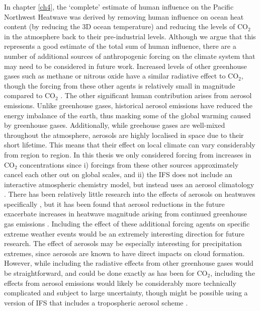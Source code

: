     In chapter \ref{ch4}, the `complete' estimate of human influence on the Pacific Northwest Heatwave was derived by removing human influence on ocean heat content (by reducing the 3D ocean temperature) and reducing the levels of CO$_2$ in the atmosphere back to their pre-industrial levels. Although we argue that this represents a good estimate of the total sum of human influence, there are a number of additional sources of anthropogenic forcing on the climate system that may need to be considered in future work. Increased levels of other greenhouse gases such as methane or nitrous oxide have a similar radiative effect to CO$_2$, though the forcing from these other agents is relatively small in magnitude compared to CO$_2$ \citep{masson-delmotte_earths_2021}. The other significant human contribution arises from aerosol emissions. Unlike greenhouse gases, historical aerosol emissions have reduced the energy imbalance of the earth, thus masking some of the global warming caused by greenhouse gases. Additionally, while greehouse gases are well-mixed throughout the atmosphere, aerosols are highly localised in space due to their short lifetime. This means that their effect on local climate can vary considerably from region to region. In this thesis we only considered forcing from increases in CO$_2$ concentrations since i) forcings from these other sources approximately cancel each other out on global scales, and ii) the IFS does not include an interactive atmospheric chemistry model, but instead uses an aerosol climatology \citep{bozzo_aerosol_2020}. There has been relatively little research into the effects of aerosols on heatwaves specifically \citep{horton_review_2016}, but it has been found that aerosol reductions in the future exacerbate increases in heatwave magnitude arising from continued greenhouse gas emissions \citep{zhao_strong_2019}. Including the effect of these additional forcing agents on specific extreme weather events would be an extremely interesting direction for future research. The effect of aerosols may be especially interesting for precipitation extremes, since aerosols are known to have direct impacts on cloud formation. However, while including the radiative effects from other greenhouse gases would be straightforward, and could be done exactly as has been for CO$_2$, including the effects from aerosol emissions would likely be considerably more technically complicated and subject to large uncertainty, though might be possible using a version of IFS that includes a tropospheric aerosol scheme \citep{remy_description_2019}.

